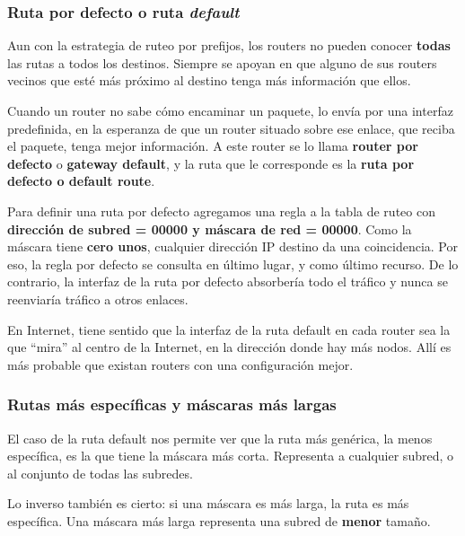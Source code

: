\documentclass[spanish,a4paper,]{article}
\begin{document}
\hypertarget{ruta-por-defecto-o-ruta-default}{%
\subsubsection{\texorpdfstring{Ruta por defecto o ruta
\emph{default}}{Ruta por defecto o ruta default}}\label{ruta-por-defecto-o-ruta-default}}

Aun con la estrategia de ruteo por prefijos, los routers no pueden
conocer \textbf{todas} las rutas a todos los destinos. Siempre se apoyan
en que alguno de sus routers vecinos que esté más próximo al destino
tenga más información que ellos.

Cuando un router no sabe cómo encaminar un paquete, lo envía por una
interfaz predefinida, en la esperanza de que un router situado sobre ese
enlace, que reciba el paquete, tenga mejor información. A este router se
lo llama \textbf{router por defecto} o \textbf{gateway default}, y la
ruta que le corresponde es la \textbf{ruta por defecto o default route}.

Para definir una ruta por defecto agregamos una regla a la tabla de
ruteo con \textbf{dirección de subred = 00000 y máscara de red = 00000}.
Como la máscara tiene \textbf{cero unos}, cualquier dirección IP destino
da una coincidencia. Por eso, la regla por defecto se consulta en último
lugar, y como último recurso. De lo contrario, la interfaz de la ruta
por defecto absorbería todo el tráfico y nunca se reenviaría tráfico a
otros enlaces.

En Internet, tiene sentido que la interfaz de la ruta default en cada
router sea la que ``mira'' al centro de la Internet, en la dirección
donde hay más nodos. Allí es más probable que existan routers con una
configuración mejor.

\hypertarget{rutas-muxe1s-especuxedficas-y-muxe1scaras-muxe1s-largas}{%
\subsubsection{Rutas más específicas y máscaras más
largas}\label{rutas-muxe1s-especuxedficas-y-muxe1scaras-muxe1s-largas}}

El caso de la ruta default nos permite ver que la ruta más genérica, la
menos específica, es la que tiene la máscara más corta. Representa a
cualquier subred, o al conjunto de todas las subredes.

Lo inverso también es cierto: si una máscara es más larga, la ruta es
más específica. Una máscara más larga representa una subred de
\textbf{menor} tamaño.
\end{document}
